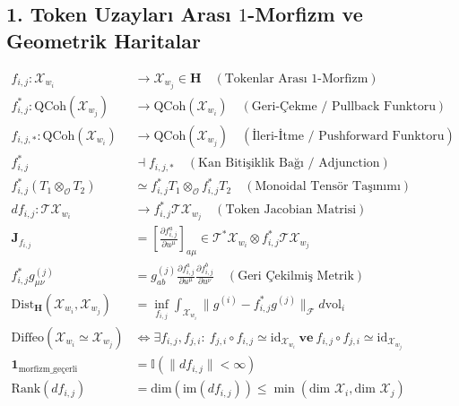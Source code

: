 \documentclass[11pt, a4paper]{article}
\begin{document}
\subsection{1. Token Uzayları Arası $1$-Morfizm ve Geometrik Haritalar}
\begin{align}
f_{i,j} : \mathcal{X}_{w_i} &\longrightarrow \mathcal{X}_{w_j} \in \mathbf{H} \quad (\text{Tokenlar Arası $1$-Morfizm}) \\
f_{i,j}^* : \text{QCoh}(\mathcal{X}_{w_j}) &\longrightarrow \text{QCoh}(\mathcal{X}_{w_i}) \quad (\text{Geri-Çekme / Pullback Funktoru}) \\
f_{i,j, *} : \text{QCoh}(\mathcal{X}_{w_i}) &\longrightarrow \text{QCoh}(\mathcal{X}_{w_j}) \quad (\text{İleri-İtme / Pushforward Funktoru}) \\
f_{i,j}^* &\dashv f_{i,j, *} \quad (\text{Kan Bitişiklik Bağı / Adjunction}) \\
f_{i,j}^*(T_1 \otimes_{\mathcal{O}} T_2) &\simeq f_{i,j}^* T_1 \otimes_{\mathcal{O}} f_{i,j}^* T_2 \quad (\text{Monoidal Tensör Taşınımı}) \\
df_{i,j} : \mathcal{T}\mathcal{X}_{w_i} &\longrightarrow f_{i,j}^* \mathcal{T}\mathcal{X}_{w_j} \quad (\text{Token Jacobian Matrisi}) \\
\mathbf{J}_{f_{i,j}} &= \left[ \frac{\partial f_{i,j}^a}{\partial u^\mu} \right]_{a\mu} \in \mathcal{T}^*\mathcal{X}_{w_i} \otimes f_{i,j}^* \mathcal{T}\mathcal{X}_{w_j} \\
f_{i,j}^* g_{\mu\nu}^{(j)} &= g_{ab}^{(j)} \frac{\partial f_{i,j}^a}{\partial u^\mu} \frac{\partial f_{i,j}^b}{\partial u^\nu} \quad (\text{Geri Çekilmiş Metrik}) \\
\text{Dist}_{\mathbf{H}}(\mathcal{X}_{w_i}, \mathcal{X}_{w_j}) &= \inf_{f_{i,j}} \int_{\mathcal{X}_{w_i}} \|g^{(i)} - f_{i,j}^* g^{(j)}\|_{\mathcal{F}} d\text{vol}_i \\
\text{Diffeo}(\mathcal{X}_{w_i} \simeq \mathcal{X}_{w_j}) &\iff \exists f_{i,j}, f_{j,i}: \ f_{j,i} \circ f_{i,j} \simeq \mathrm{id}_{\mathcal{X}_{w_i}} \ \textbf{ve} \ f_{i,j} \circ f_{j,i} \simeq \mathrm{id}_{\mathcal{X}_{w_j}} \\
\mathbf{1}_{\text{morfizm\_geçerli}} &= \mathbb{I}\left( \|df_{i,j}\| < \infty \right) \\
\text{Rank}(df_{i,j}) &= \text{dim}(\text{im}(df_{i,j})) \le \min(\text{dim } \mathcal{X}_i, \text{dim } \mathcal{X}_j)
\end{align}
\end{document}
